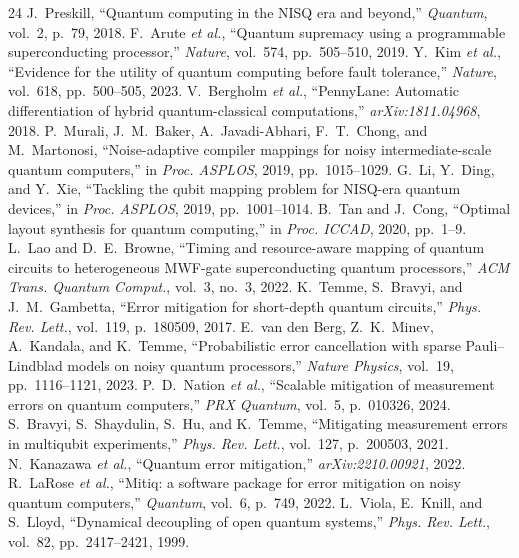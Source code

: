 \documentclass[journal,10pt,twocolumn]{IEEEtran}
\begin{document}
\begin{thebibliography}{24}
 J.~Preskill, ``Quantum computing in the NISQ era and beyond,'' \emph{Quantum}, vol.~2, p.~79, 2018.
 F.~Arute \emph{et al.}, ``Quantum supremacy using a programmable superconducting processor,'' \emph{Nature}, vol.~574, pp.~505--510, 2019.
 Y.~Kim \emph{et al.}, ``Evidence for the utility of quantum computing before fault tolerance,'' \emph{Nature}, vol.~618, pp.~500--505, 2023.
 V.~Bergholm \emph{et al.}, ``PennyLane: Automatic differentiation of hybrid quantum-classical computations,'' \emph{arXiv:1811.04968}, 2018.
 P.~Murali, J.~M.~Baker, A.~Javadi-Abhari, F.~T.~Chong, and M.~Martonosi, ``Noise-adaptive compiler mappings for noisy intermediate-scale quantum computers,'' in \emph{Proc. ASPLOS}, 2019, pp.~1015--1029.
 G.~Li, Y.~Ding, and Y.~Xie, ``Tackling the qubit mapping problem for NISQ-era quantum devices,'' in \emph{Proc. ASPLOS}, 2019, pp.~1001--1014.
 B.~Tan and J.~Cong, ``Optimal layout synthesis for quantum computing,'' in \emph{Proc. ICCAD}, 2020, pp.~1--9.
 L.~Lao and D.~E.~Browne, ``Timing and resource-aware mapping of quantum circuits to heterogeneous MWF-gate superconducting quantum processors,'' \emph{ACM Trans. Quantum Comput.}, vol.~3, no.~3, 2022.
 K.~Temme, S.~Bravyi, and J.~M.~Gambetta, ``Error mitigation for short-depth quantum circuits,'' \emph{Phys. Rev. Lett.}, vol.~119, p.~180509, 2017.
 E.~van den Berg, Z.~K.~Minev, A.~Kandala, and K.~Temme, ``Probabilistic error cancellation with sparse Pauli--Lindblad models on noisy quantum processors,'' \emph{Nature Physics}, vol.~19, pp.~1116--1121, 2023.
 P.~D.~Nation \emph{et al.}, ``Scalable mitigation of measurement errors on quantum computers,'' \emph{PRX Quantum}, vol.~5, p.~010326, 2024.
 S.~Bravyi, S.~Shaydulin, S.~Hu, and K.~Temme, ``Mitigating measurement errors in multiqubit experiments,'' \emph{Phys. Rev. Lett.}, vol.~127, p.~200503, 2021.
 N.~Kanazawa \emph{et al.}, ``Quantum error mitigation,'' \emph{arXiv:2210.00921}, 2022.
 R.~LaRose \emph{et al.}, ``Mitiq: a software package for error mitigation on noisy quantum computers,'' \emph{Quantum}, vol.~6, p.~749, 2022.
 L.~Viola, E.~Knill, and S.~Lloyd, ``Dynamical decoupling of open quantum systems,'' \emph{Phys. Rev. Lett.}, vol.~82, pp.~2417--2421, 1999.

\end{thebibliography}
\end{document}
